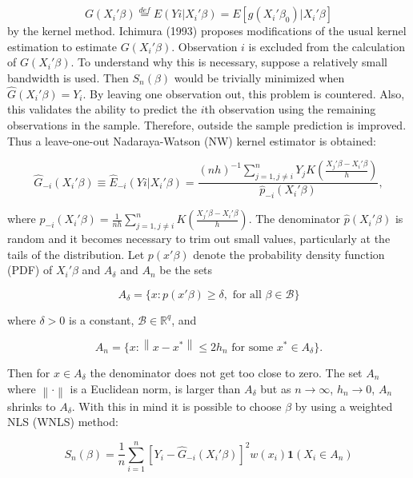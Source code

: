 \documentclass[a4paper]{article}
\newcommand{\norm}[1]{\left\lVert#1\right\rVert}
\begin{document}
\begin{equation}
G(X_i'\beta) \stackrel{def}{=} E(Yi|X_i'\beta) = E[g(X_i'\beta_0)|X_i'\beta]
\end{equation}
 by the kernel method. Ichimura (1993) proposes modifications of the usual kernel estimation to estimate $G(X_i'\beta)$. Observation $i$ is excluded from the calculation of $G(X_i'\beta)$. To understand why this is necessary, suppose a relatively small bandwidth is used. Then $S_n(\beta)$ would be trivially minimized when $\hat{G}(X_i'\beta) = Y_i$. By leaving one observation out, this problem is countered. Also, this validates the ability to predict the $i$th observation using the remaining observations in the sample. Therefore, outside the sample prediction is improved. Thus a leave-one-out Nadaraya-Watson (NW) kernel estimator is obtained:

\begin{equation}
\hat{G}_{-i}(X_i'\beta) \equiv \hat{E}_{-i}(Yi|X_i'\beta) = \frac{(nh)^{-1}\sum_{j=1, j \neq i }^{n}  Y_jK(\frac{X_j'\beta - X_i'\beta}{h})}{\hat{p}_{-i}(X_i'\beta)},
\end{equation}

where $\hat{p}_{-i}(X_i'\beta) = \frac{1}{nh}\sum_{j=1,j \neq i}^{n}K(\frac{X_j'\beta - X_i'\beta}{h})$.  The denominator $\hat{p}(X_i'\beta)$ is random and it becomes necessary to trim out small values, particularly at the tails of the distribution. Let $p(x'\beta)$ denote the probability density function (PDF) of $X_i'\beta$ and $A_\delta$ and $A_n$ be the sets

\[ A_\delta = \{ x : p(x'\beta) \geq \delta, \text{ for all }  \beta \in \mathcal{B} \}
\]

where $\delta > 0$ is a constant, $\mathcal{B} \in \mathbb{R}^q$, and

\[ A_n = \{ x : \norm{x - x^*} \leq 2h_n \text{ for some } x^* \in A_\delta\}.
\]

Then for $x \in A_\delta$ the denominator does not get too close to zero. The set $A_n$ where $\norm{\cdot}$ is a Euclidean norm, is larger than $A_\delta$ but as $ n \rightarrow \infty $, $h_n \rightarrow 0$, $A_n$ shrinks to $A_\delta$. With this in mind it is possible to choose $\beta$ by using a weighted NLS (WNLS) method:

\begin{equation}
S_n(\beta) = \frac{1}{n} \sum_{i=1}^{n}  [Y_i - \hat{G}_{-i}(X_i'\beta)]^2w(x_i)\mathbf{1}{(X_i \in A_n)}
\end{equation}
\end{document}
